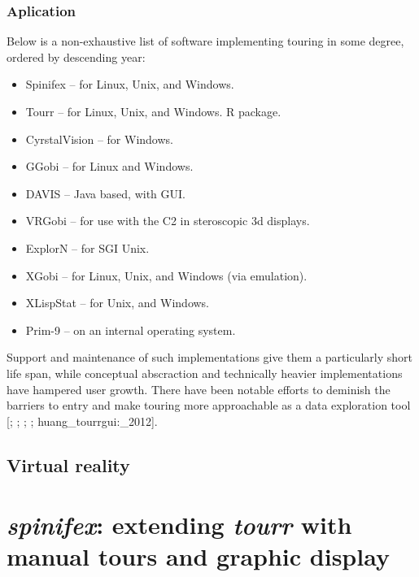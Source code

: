 \documentclass{monashthesis}
\begin{document}
\subsection{Aplication}\label{aplication}

Below is a non-exhaustive list of software implementing touring in some
degree, ordered by descending year:

\begin{itemize}
\tightlist
\item
  Spinifex \autocite{spinifex} -- for Linux, Unix, and Windows.
\item
  Tourr \autocite{wickham_tourr_2011} -- for Linux, Unix, and Windows. R
  package.
\item
  CyrstalVision \autocite{wegman_visual_2003} -- for Windows.
\item
  GGobi \autocite{swayne_ggobi:_2003} -- for Linux and Windows.
\item
  DAVIS \autocite{huh_davis:_2002} -- Java based, with GUI.
\item
  VRGobi \autocite{nelson_xgobi_1998} -- for use with the C2 in
  steroscopic 3d displays.
\item
  ExplorN \autocite{carr_explorn:_1996} -- for SGI Unix.
\item
  XGobi \autocite{swayne_xgobi:_1991} -- for Linux, Unix, and Windows
  (via emulation).
\item
  XLispStat \autocite{tierney_lisp-stat:_1990} -- for Unix, and Windows.
\item
  Prim-9 \autocites{asimov_grand_1985}{fisherkeller_prim-9:_1974} -- on
  an internal operating system.
\end{itemize}

Support and maintenance of such implementations give them a particularly
short life span, while conceptual abscraction and technically heavier
implementations have hampered user growth. There have been notable
efforts to deminish the barriers to entry and make touring more
approachable as a data exploration tool {[}\textcite{huh_davis:_2002};
\textcite{swayne_ggobi:_2003}; \textcite{wegman_visual_2003};
\textcite{wickham_tourr_2011}; huang\_tourrgui:\_2012{]}.

\section{Virtual reality}\label{virtual-reality}

\chapter{\texorpdfstring{\emph{spinifex}: extending \emph{tourr} with
manual tours and graphic
display}{spinifex: extending tourr with manual tours and graphic display}}\label{ch:spinifex}
\end{document}
